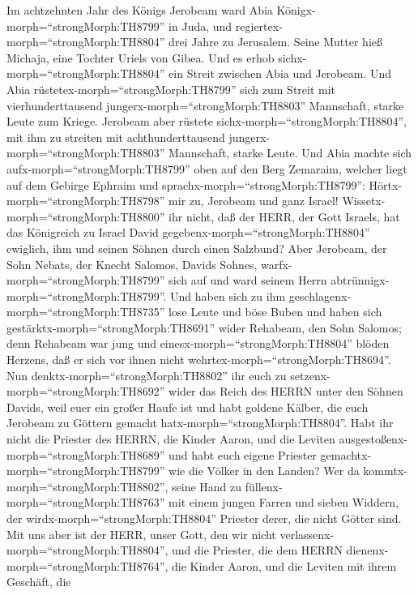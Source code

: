 Im achtzehnten Jahr des Königs Jerobeam ward Abia
Königx-morph=``strongMorph:TH8799'' in Juda,  und
regiertex-morph=``strongMorph:TH8804'' drei Jahre zu Jerusalem. Seine
Mutter hieß Michaja, eine Tochter Uriels von Gibea. Und es erhob
sichx-morph=``strongMorph:TH8804'' ein Streit zwischen Abia und
Jerobeam.  Und Abia rüstetex-morph=``strongMorph:TH8799''
sich zum Streit mit vierhunderttausend
jungerx-morph=``strongMorph:TH8803'' Mannschaft, starke Leute zum
Kriege. Jerobeam aber rüstete sichx-morph=``strongMorph:TH8804'', mit
ihm zu streiten mit achthunderttausend
jungerx-morph=``strongMorph:TH8803'' Mannschaft, starke Leute.
 Und Abia machte sich aufx-morph=``strongMorph:TH8799'' oben
auf den Berg Zemaraim, welcher liegt auf dem Gebirge Ephraim und
sprachx-morph=``strongMorph:TH8799'': Hörtx-morph=``strongMorph:TH8798''
mir zu, Jerobeam und ganz Israel! 
Wissetx-morph=``strongMorph:TH8800'' ihr nicht, daß der HERR, der Gott
Israels, hat das Königreich zu Israel David
gegebenx-morph=``strongMorph:TH8804'' ewiglich, ihm und seinen Söhnen
durch einen Salzbund?  Aber Jerobeam, der Sohn Nebats, der
Knecht Salomos, Davids Sohnes, warfx-morph=``strongMorph:TH8799'' sich
auf und ward seinem Herrn abtrünnigx-morph=``strongMorph:TH8799''.
 Und haben sich zu ihm
geschlagenx-morph=``strongMorph:TH8735'' lose Leute und böse Buben und
haben sich gestärktx-morph=``strongMorph:TH8691'' wider Rehabeam, den
Sohn Salomos; denn Rehabeam war jung und
einesx-morph=``strongMorph:TH8804'' blöden Herzens, daß er sich vor
ihnen nicht wehrtex-morph=``strongMorph:TH8694''.  Nun
denktx-morph=``strongMorph:TH8802'' ihr euch zu
setzenx-morph=``strongMorph:TH8692'' wider das Reich des HERRN unter den
Söhnen Davids, weil euer ein großer Haufe ist und habt goldene Kälber,
die euch Jerobeam zu Göttern gemacht hatx-morph=``strongMorph:TH8804''.
 Habt ihr nicht die Priester des HERRN, die Kinder Aaron,
und die Leviten ausgestoßenx-morph=``strongMorph:TH8689'' und habt euch
eigene Priester gemachtx-morph=``strongMorph:TH8799'' wie die Völker in
den Landen? Wer da kommtx-morph=``strongMorph:TH8802'', seine Hand zu
füllenx-morph=``strongMorph:TH8763'' mit einem jungen Farren und sieben
Widdern, der wirdx-morph=``strongMorph:TH8804'' Priester derer, die
nicht Götter sind.  Mit uns aber ist der HERR, unser Gott,
den wir nicht verlassenx-morph=``strongMorph:TH8804'', und die Priester,
die dem HERRN dienenx-morph=``strongMorph:TH8764'', die Kinder Aaron,
und die Leviten mit ihrem Geschäft,  die
